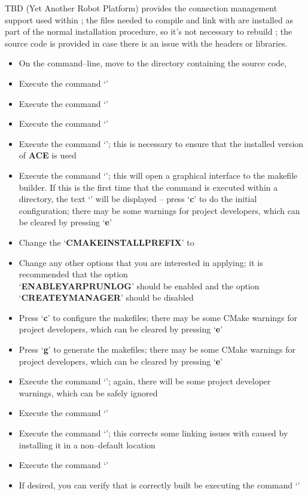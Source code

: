 \tertiaryEnd{}
TBD
\tertiaryEnd{}
\secondaryEnd{}
\textbf{\yarp} (Yet Another Robot Platform) provides the connection management support
used within \mplusm{}; the files needed to compile and link with \yarp{} are installed as
part of the normal \mplusm{} installation procedure, so it's not necessary to rebuild
\yarp{}; the source code is provided in case there is an issue with the headers or
libraries.
\begin{itemize}
\item On the command--line, move to the directory containing the \mplusm{} source code,
\item Execute the command `'
\item Execute the command `'
\item Execute the command `'
\item Execute the command `'; this is necessary to
ensure that the installed version of \textbf{ACE} is used
\item Execute the command `'; this will open a graphical interface to the
makefile builder. If this is the first time that the command is executed within a
directory, the text `' will be displayed -- press `\textbf{c}' to do
the initial configuration; there may be some warnings for project developers, which can be
cleared by pressing `\textbf{e}'
\item Change the `\textbf{CMAKE\fatUnderscore{}INSTALL\fatUnderscore{}PREFIX}' to
\item Change any other options that you are interested in applying; it is recommended that
the option\\
`\textbf{ENABLE\fatUnderscore{}YARPRUN\fatUnderscore{}LOG}' should be enabled and the
option `\textbf{CREATE\fatUnderscore{}YMANAGER}' should be disabled
\item Press `\textbf{c}' to configure the makefiles; there may be some CMake warnings for
project developers, which can be cleared by pressing `\textbf{e}'
\item Press `\textbf{g}' to generate the makefiles; there may be some CMake warnings for
project developers, which can be cleared by pressing `\textbf{e}'
\item Execute the command `'; again, there will be some project developer
warnings, which can be safely ignored
\item Execute the command `'
\item Execute the command `'; this corrects some linking
issues with \yarp{} caused by installing it in a non--default location
\item Execute the command `'
\item If desired, you can verify that \yarp{} is correctly built be executing the command
`'
\end{itemize}
